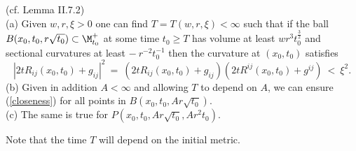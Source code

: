 \begin{lemma}
  \label{lem:kl-noncollapsed-regions-lower-curvature-bound-almost-hyperbolic-large-scale-noncollapsing-lemma}
 \label{lemII.7.2} (cf. Lemma II.7.2) \\
(a) Given $w, r, \xi > 0$ one can find $T = T(w,r,\xi) < \infty$ such that
if the ball $B(x_0, t_0, r \sqrt{t_0}) \subset \M_{t_0}^+$ at some time $t_0 \ge T$ has
volume at least $wr^3 t_0^{\frac32}$ and sectional curvatures at least
$- \: r^{-2} t_0^{-1}$ then the curvature at $(x_0, t_0)$
satisfies
\begin{equation} \label{closeness}
|2tR_{ij}(x_0, t_0) + g_{ij}|^2 \: = \:
(2tR_{ij}(x_0, t_0) + g_{ij})(2tR^{ij}(x_0, t_0) + g^{ij}) \: < \: \xi^2.
\end{equation}
(b) Given in addition $A < \infty$ and allowing $T$ to depend on $A$, we
can ensure (\ref{closeness}) for all points in
$B(x_0, t_0, Ar \sqrt{t_0})$. \\
(c) The same is true for $P(x_0, t_0, Ar \sqrt{t_0}, A r^2 t_0)$.

Note that the time $T$ will depend on the initial metric.
\end{lemma}
